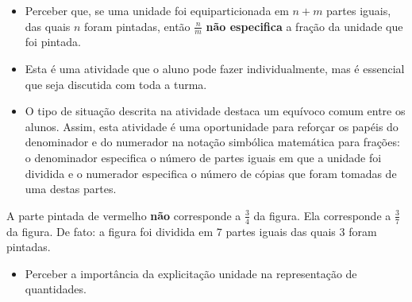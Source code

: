 \begin{multicols}{2}
\begin{solucao}{}{}
\end{solucao}



\begin{objetivos}{}{}
  \begin{itemize} %
    \item       Perceber que, se uma unidade foi equiparticionada em       $n + m$ partes iguais, das quais       $n$ foram pintadas, então       $\frac{n}{m}$     {\bf não especifica}       a fração da unidade que foi pintada.
\end{itemize} %
\end{objetivos}

\begin{orientacoes}
\begin{itemize} %
    \item       Esta é uma atividade que o aluno pode fazer individualmente, mas é essencial que seja discutida com toda a turma.
    \item       O tipo de situação descrita na atividade destaca um equívoco comum entre os alunos. Assim, esta atividade é uma oportunidade para reforçar os papéis do denominador e do numerador na notação simbólica matemática para frações: o denominador especifica o número de partes iguais em que a unidade foi dividida e o numerador especifica o número de cópias que foram tomadas de uma destas partes.
\end{itemize} %

\end{orientacoes}

\begin{solucao}{}{}
  A parte pintada de vermelho   {\bf não}   corresponde a   $\frac{3}{4}$ da figura. Ela corresponde a   $\frac{3}{7}$ da figura. De fato: a figura foi dividida em   $7$ partes iguais das quais   $3$ foram pintadas.

\end{solucao}



\begin{objetivos}{}{}
\begin{itemize} %
    \item       Perceber a importância da explicitação unidade na representação de quantidades.
\end{itemize} %
\end{objetivos}


\end{multicols}
